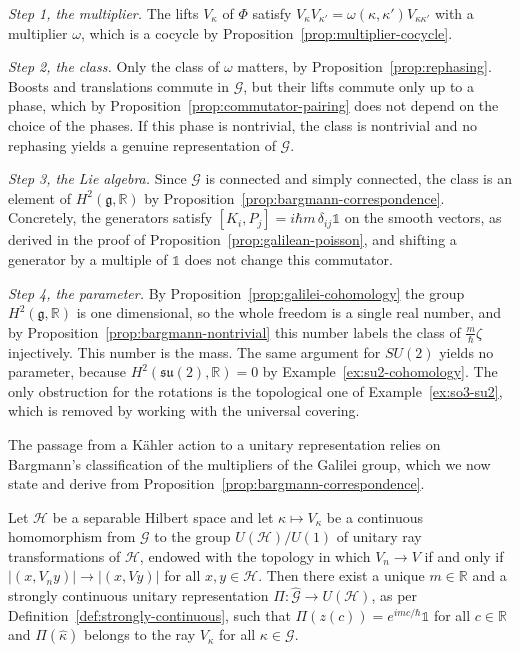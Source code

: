 \begin{remark}\label{rem:bargmann-galilei}
	\emph{Step 1, the multiplier.} The lifts $V_\kappa$ of $\Phi$ satisfy $V_\kappa V_{\kappa'}=\omega(\kappa,\kappa')V_{\kappa\kappa'}$ with a multiplier $\omega$, which is a cocycle by Proposition~\ref{prop:multiplier-cocycle}.
	
	\emph{Step 2, the class.} Only the class of $\omega$ matters, by Proposition~\ref{prop:rephasing}. Boosts and translations commute in $\mathcal{G}$, but their lifts commute only up to a phase, which by Proposition~\ref{prop:commutator-pairing} does not depend on the choice of the phases. If this phase is nontrivial, the class is nontrivial and no rephasing yields a genuine representation of $\mathcal{G}$.
	
	\emph{Step 3, the Lie algebra.} Since $\mathcal{G}$ is connected and simply connected, the class is an element of $H^2(\mathfrak{g},\mathbb{R})$ by Proposition~\ref{prop:bargmann-correspondence}. Concretely, the generators satisfy $[K_i,P_j]=i\hbar m\,\delta_{ij}\mathbb{1}$ on the smooth vectors, as derived in the proof of Proposition~\ref{prop:galilean-poisson}, and shifting a generator by a multiple of $\mathbb{1}$ does not change this commutator.
	
	\emph{Step 4, the parameter.} By Proposition~\ref{prop:galilei-cohomology} the group $H^2(\mathfrak{g},\mathbb{R})$ is one dimensional, so the whole freedom is a single real number, and by Proposition~\ref{prop:bargmann-nontrivial} this number labels the class of $\frac{m}{\hbar}\zeta$ injectively. This number is the mass. The same argument for $SU(2)$ yields no parameter, because $H^2(\mathfrak{su}(2),\mathbb{R})=0$ by Example~\ref{ex:su2-cohomology}. The only obstruction for the rotations is the topological one of Example~\ref{ex:so3-su2}, which is removed by working with the universal covering.
\end{remark}

The passage from a Kähler action to a unitary representation relies on Bargmann's classification of the multipliers of the Galilei group, which we now state and derive from Proposition~\ref{prop:bargmann-correspondence}.

\begin{theorem}[Bargmann]\label{thm:bargmann}
	Let $\mathcal{H}$ be a separable Hilbert space and let $\kappa\mapsto V_\kappa$ be a continuous homomorphism from $\mathcal{G}$ to the group $U(\mathcal{H})/U(1)$ of unitary ray transformations of $\mathcal{H}$, endowed with the topology in which $V_n\to V$ if and only if $|(x,V_ny)|\to|(x,Vy)|$ for all $x,y\in\mathcal{H}$. Then there exist a unique $m\in\mathbb{R}$ and a strongly continuous unitary representation $\Pi:\widehat{\mathcal{G}}\to U(\mathcal{H})$, as per Definition~\ref{def:strongly-continuous}, such that $\Pi(z(c))=e^{imc/\hbar}\mathbb{1}$ for all $c\in\mathbb{R}$ and $\Pi(\hat\kappa)$ belongs to the ray $V_\kappa$ for all $\kappa\in\mathcal{G}$.
\end{theorem}

